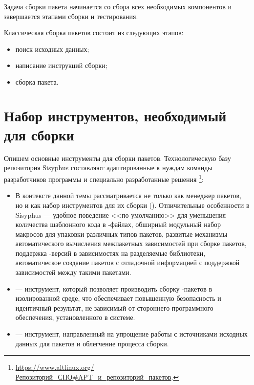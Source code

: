
Задача сборки пакета начинается со сбора всех необходимых компонентов и завершается этапами сборки и тестирования.

Классическая сборка пакетов  состоит из следующих этапов:%

\begin{itemize}
	\item поиск исходных данных;
	\item написание инструкций сборки;
	\item сборка пакета.
\end{itemize}

\section{Набор инструментов, необходимый для сборки}

Опишем основные инструменты для сборки пакетов. Технологическую
базу репозитория Sisyphus составляют адаптированные к нуждам команды разработчиков
программы и специально разработанные решения%
\footnote{\href{https://www.altlinux.org/\%D0\%A0\%D0\%B5\%D0\%BF\%D0\%BE\%D0\%B7\%D0\%B8\%D1\%82\%D0\%BE\%D1\%80\%D0\%B8\%D0\%B9_\%D0\%A1\%D0\%9F\%D0\%9E\#APT_\%D0\%B8_\%D1\%80\%D0\%B5\%D0\%BF\%D0\%BE\%D0\%B7\%D0\%B8\%D1\%82\%D0\%BE\%D1\%80\%D0\%B8\%D0\%B9_\%D0\%BF\%D0\%B0\%D0\%BA\%D0\%B5\%D1\%82\%D0\%BE\%D0\%B2}{https://www.altlinux.org/Репозиторий\_СПО\#APT\_и\_репозиторий\_пакетов}.}:
\begin{itemize}
	\item {}  В контексте данной темы  рассматривается не только как менеджер пакетов,
		но и как набор инструментов для их сборки (). Отличительные особенности 
		в Sisyphus --- удобное поведение <<по умолчанию>> для уменьшения количества шаблонного кода
		в -файлах, обширный модульный набор
		макросов для упаковки различных типов пакетов, развитые механизмы автоматического вычисления
		межпакетных зависимостей при сборке пакетов, поддержка -версий в зависимостях на
		разделяемые библиотеки, автоматическое создание пакетов с отладочной информацией с поддержкой
		зависимостей между такими пакетами.
	\item {} --- инструмент, который позволяет производить сборку -пакетов в изолированной среде,
		что обеспечивает повышенную безопасность и идентичный результат, не зависимый от стороннего
		программного обеспечения, установленного в системе.
	\item {} --- инструмент, направленный на упрощение работы с источниками исходных данных для пакетов
		и облегчение процесса сборки.
\end{itemize}

